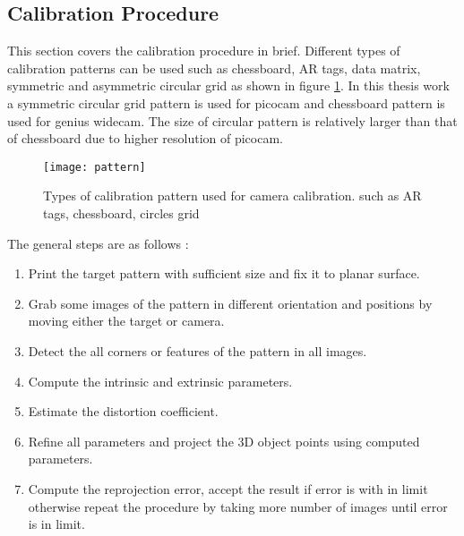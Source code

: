 \subsection{Calibration Procedure}
This section covers the calibration procedure in brief. Different types of calibration patterns can be used such as chessboard, AR tags, data matrix, symmetric and asymmetric circular grid as shown in figure \ref{fig:pattern}. In this thesis work a symmetric circular grid pattern is used for picocam and chessboard pattern is used for genius widecam. The size of circular pattern is relatively larger than that of chessboard due to higher resolution of picocam.\\
\begin{figure}[h!]
	\centering
	\texttt{[image: pattern]}
	\caption{Types of calibration pattern used for camera calibration. such as AR tags, chessboard, circles grid \cite{calibio}}
	\label{fig:pattern}
\end{figure}
\newline
The general steps are as follows \cite{cameracalib}:
\begin{enumerate}
	\item Print the target pattern with sufficient size and fix it to planar surface.
	\item Grab some images of the pattern in different orientation and positions by moving either the target or camera.
	\item Detect the all corners or features of the pattern in all images.
	\item Compute the intrinsic and extrinsic parameters.
	\item Estimate the distortion coefficient.
	\item Refine all parameters and project the 3D object points using computed parameters.
	\item Compute the reprojection error, accept the result if error is with in limit otherwise repeat the procedure by taking more number of images until error is in limit.
\end{enumerate}

